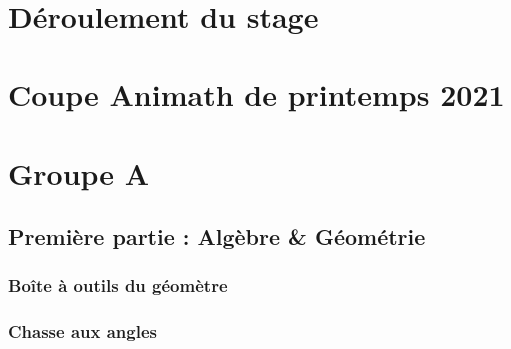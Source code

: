 \documentclass[poly,trombi]{valbonne}
\begin{document}

\pagestyle{empty}~

\pagebreak

\clearpage


\pagestyle{plain}

\footnotesize
\pagestyle{trombi}
\newpage


\normalsize


\pagestyle{empty}

\renewcommand{\headrulewidth}{0.4pt}

\tableofcontents

\chapter{Déroulement du stage}
\pagestyle{plain}





\chapter{Coupe Animath de printemps 2021}







\chapter{Groupe A}

\minitoc \clearpage

\section{Première partie : Algèbre \& Géométrie}

\subsection{Boîte à outils du géomètre}


\subsection{Chasse aux angles}
\end{document}
